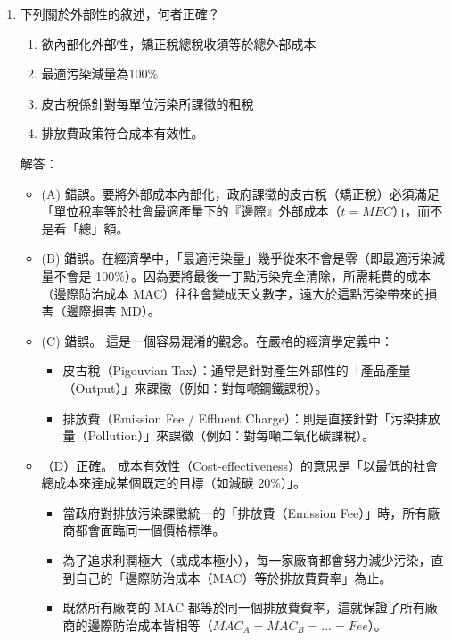 \documentclass[12pt, a4paper]{article}
\begin{document}
\begin{enumerate}
    \item 下列關於外部性的敘述，何者正確？
    \begin{enumerate}[label=\Alph*.]
        \item 欲內部化外部性，矯正稅總稅收須等於總外部成本
        \item 最適污染減量為100\%
        \item 皮古稅係針對每單位污染所課徵的租稅
        \item 排放費政策符合成本有效性。
    \end{enumerate}
    解答：
    \begin{itemize}
        \item (A) 錯誤。要將外部成本內部化，政府課徵的皮古稅（矯正稅）必須滿足「單位稅率等於社會最適產量下的『邊際』外部成本（\(t = MEC\)）」，而不是看「總」額。
        \item (B) 錯誤。在經濟學中，「最適污染量」幾乎從來不會是零（即最適污染減量不會是 100\%）。因為要將最後一丁點污染完全清除，所需耗費的成本（邊際防治成本 MAC）往往會變成天文數字，遠大於這點污染帶來的損害（邊際損害 MD）。
        \item (C) 錯誤。 這是一個容易混淆的觀念。在嚴格的經濟學定義中：
        \begin{itemize}
            \item 皮古稅（Pigouvian Tax）：通常是針對產生外部性的「產品產量（Output）」來課徵（例如：對每噸鋼鐵課稅）。
            \item 排放費（Emission Fee / Effluent Charge）：則是直接針對「污染排放量（Pollution）」來課徵（例如：對每噸二氧化碳課稅）。
        \end{itemize}
        \item （D）正確。 成本有效性（Cost-effectiveness）的意思是「以最低的社會總成本來達成某個既定的目標（如減碳 20\%）」。
        \begin{itemize}
            \item 當政府對排放污染課徵統一的「排放費（Emission Fee）」時，所有廠商都會面臨同一個價格標準。
            \item 為了追求利潤極大（或成本極小），每一家廠商都會努力減少污染，直到自己的「邊際防治成本（MAC）等於排放費費率」為止。
            \item 既然所有廠商的 MAC 都等於同一個排放費費率，這就保證了所有廠商的邊際防治成本皆相等（\(MAC_A = MAC_B = ... = Fee\)）。
        \end{itemize}
    \end{itemize}


\end{enumerate}
\end{document}
